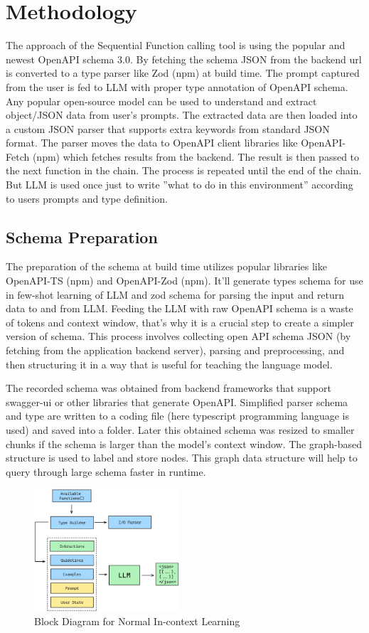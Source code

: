 \documentclass[conference]{IEEEtran}
\begin{document}
\section{Methodology}
The approach of the Sequential Function calling tool is using the popular and
newest OpenAPI schema 3.0. By fetching the schema JSON from the backend url is
converted to a type parser like Zod (npm) at build time. The prompt captured
from the user is fed to LLM with proper type annotation of OpenAPI schema. Any
popular open-source model can be used to understand and extract object/JSON
data from user's prompts. The extracted data are then loaded into a custom JSON
parser that supports extra keywords from standard JSON format. The parser moves
the data to OpenAPI client libraries like OpenAPI-Fetch (npm) which fetches
results from the backend. The result is then passed to the next function in the
chain. The process is repeated until the end of the chain. But LLM is used once
just to write ”what to do in this environment” according to users prompts and
type definition.

\subsection{Schema Preparation}\label{AA}
The preparation of the schema at build time utilizes popular libraries like
OpenAPI-TS (npm) and OpenAPI-Zod (npm). It’ll generate types schema for use in
few-shot learning of LLM and zod schema for parsing the input and return data
to and from LLM. Feeding the LLM with raw OpenAPI schema is a waste of tokens
and context window, that’s why it is a crucial step to create a simpler version
of schema. This process involves collecting open API schema JSON (by fetching
from the application backend server), parsing and preprocessing, and then
structuring it in a way that is useful for teaching the language model.

The recorded schema was obtained from backend frameworks that support
swagger-ui or other libraries that generate OpenAPI. Simplified parser schema
and type are written to a coding file (here typescript programming language is
used) and saved into a folder. Later this obtained schema was resized to
smaller chunks if the schema is larger than the model's context window. The
graph-based structure is used to label and store nodes. This graph data
structure will help to query through large schema faster in runtime.

\begin{figure}[htbp]
    \centering
    \includegraphics[width=0.48\textwidth]{images/without-finetuning.png}
    \caption{Block Diagram for Normal In-context Learning}
    \label{fig}
\end{figure}
\end{document}
